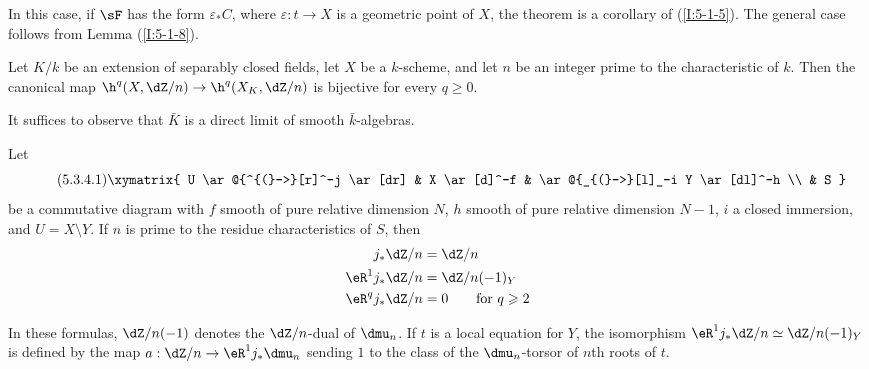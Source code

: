 \documentclass[oneside]{book}
\begin{document}
In this case, if $\sF$ has the form $\varepsilon_*C$, where
$\varepsilon:t\to X$ is a geometric point of $X$, the theorem is a
corollary of (\ref{I:5-1-5}). The general case follows from Lemma
(\ref{I:5-1-8}).

\begin{corollary}\label{I:5-3-3}
Let $K/k$ be an extension of separably closed fields, let $X$ be a
$k$-scheme, and let $n$ be an integer prime to the characteristic of
$k$. Then the canonical map
$\h^q(X,\dZ/n)\to\h^q(X_K,\dZ/n)$ is bijective for every
$q\geqslant0$.
\end{corollary}

It suffices to observe that $\bar K$ is a direct limit of smooth
$\bar k$-algebras.

\begin{theorem}\label{I:5-3-4}
Let
\begin{equation*}\tag{5.3.4.1}\label{I:eq:5-3-4-1}\xymatrix{
  U \ar@{^{(}->}[r]^-j \ar[dr]
    & X \ar[d]^-f
    & \ar@{_{(}->}[l]_-i Y \ar[dl]^-h \\
  & S
}\end{equation*}
be a commutative diagram with $f$ smooth of pure relative dimension $N$,
$h$ smooth of pure relative dimension $N-1$, $i$ a closed immersion,
and $U=X\setminus Y$. If $n$ is prime to the residue characteristics of
$S$, then
\begin{equation*}
\begin{aligned}
  j_* \dZ/n     &= \dZ/n \\
  \eR^1 j_*\dZ/n &= \dZ/n(-1)_Y \\
  \eR^q j_*\dZ/n &= 0 \qquad \text{for $q\geqslant 2$}
\end{aligned}
\end{equation*}
\end{theorem}

In these formulas, $\dZ/n(-1)$ denotes the $\dZ/n$-dual of $\dmu_n$.
If $t$ is a local equation for $Y$, the isomorphism
$\eR^1j_*\dZ/n\simeq\dZ/n(-1)_Y$ is defined by the map
$a:\dZ/n\to\eR^1j_*\dmu_n$ sending $1$ to the class of the
$\dmu_n$-torsor of $n$th roots of $t$.
\end{document}
